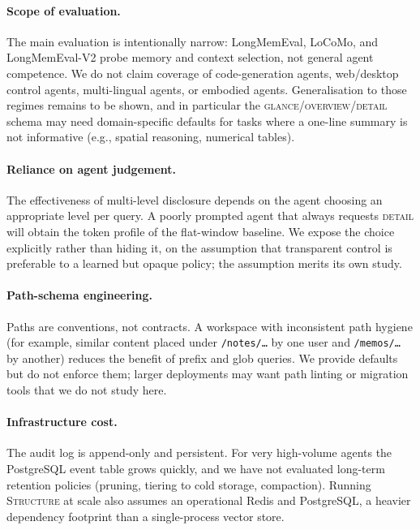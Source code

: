 
\paragraph{Scope of evaluation.} The main evaluation is intentionally
narrow: LongMemEval, LoCoMo, and LongMemEval-V2 probe memory and
context selection, not general agent competence. We do not claim
coverage of code-generation agents, web/desktop control agents,
multi-lingual agents, or embodied agents. Generalisation to those
regimes remains to be shown, and in particular the
\textsc{glance}/\textsc{overview}/\textsc{detail} schema may need
domain-specific defaults for tasks where a one-line summary is not
informative (e.g., spatial reasoning, numerical tables).

\paragraph{Reliance on agent judgement.} The effectiveness of
multi-level disclosure depends on the agent choosing an appropriate
level per query. A poorly prompted agent that always requests
\textsc{detail} will obtain the token profile of the flat-window
baseline. We expose the choice explicitly rather than hiding it, on
the assumption that transparent control is preferable to a learned
but opaque policy; the assumption merits its own study.

\paragraph{Path-schema engineering.} Paths are conventions, not
contracts. A workspace with inconsistent path hygiene (for example,
similar content placed under \texttt{/notes/\dots} by one user and
\texttt{/memos/\dots} by another) reduces the benefit of prefix and
glob queries. We provide defaults but do not enforce them; larger
deployments may want path linting or migration tools that we do not
study here.

\paragraph{Infrastructure cost.} The audit log is append-only and
persistent. For very high-volume agents the PostgreSQL event table
grows quickly, and we have not evaluated long-term retention policies
(pruning, tiering to cold storage, compaction). Running
\textsc{Structure} at scale also assumes an operational Redis and
PostgreSQL, a heavier dependency footprint than a single-process
vector store.

